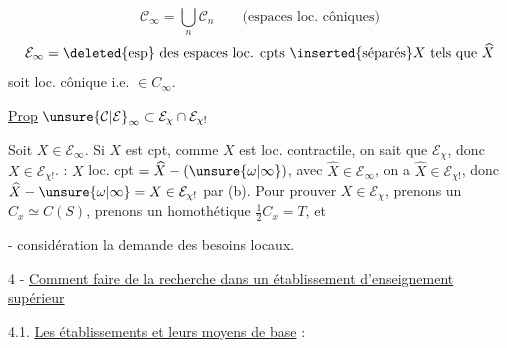 \[
\mathcal C_\infty=\bigcup_n\mathcal C_n\qquad\text{(espaces loc. côniques)}
\]
\[
\mathcal E_\infty=\deleted{\text{esp}}\text{ des espaces loc. cpts }\inserted{\text{séparés}}X\text{ tels que }\widehat X
\]
soit loc. cônique i.e. $\in C_\infty$.


\uline{Prop} $\unsure{\mathcal C|\mathcal E}_\infty\subset\mathcal E_\chi\cap\mathcal E_{\chi!}$

Soit $X\in\mathcal E_\infty$. Si $X$ est cpt,  comme $X$ est loc. contractile,
on sait que $\mathcal E_\chi$, donc $X\in\mathcal E_{\chi!}$.    : $X$ loc.
cpt $=\widehat X-(\unsure{\omega|\infty})$, avec $\widehat X\in\mathcal E_\infty$, on a $\widehat X\in\mathcal E_{\chi!}$, donc
$\widehat X-\unsure{\omega|\infty}=X\in\mathcal E_{\chi!}$ par (b). Pour prouver $X\in\mathcal E_\chi$, prenons un
$C_x\simeq C(S)$, prenons un homothétique $\frac12 C_x=T$, et



- considération la demande des besoins locaux.

4 - \uline{Comment faire de la recherche dans un établissement d'enseignement supérieur}

4.1. \uline{Les établissements et leurs moyens de base} :


